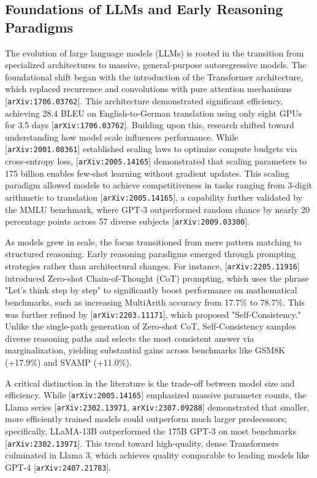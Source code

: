 \documentclass[11pt]{article}
\begin{document}
\subsection{Foundations of LLMs and Early Reasoning Paradigms}

The evolution of large language models (LLMs) is rooted in the transition from specialized architectures to massive, general-purpose autoregressive models. The foundational shift began with the introduction of the Transformer architecture, which replaced recurrence and convolutions with pure attention mechanisms [\texttt{arXiv:1706.03762}]. This architecture demonstrated significant efficiency, achieving 28.4 BLEU on English-to-German translation using only eight GPUs for 3.5 days [\texttt{arXiv:1706.03762}]. Building upon this, research shifted toward understanding how model scale influences performance. While [\texttt{arXiv:2001.08361}] established scaling laws to optimize compute budgets via cross-entropy loss, [\texttt{arXiv:2005.14165}] demonstrated that scaling parameters to 175 billion enables few-shot learning without gradient updates. This scaling paradigm allowed models to achieve competitiveness in tasks ranging from 3-digit arithmetic to translation [\texttt{arXiv:2005.14165}], a capability further validated by the MMLU benchmark, where GPT-3 outperformed random chance by nearly 20 percentage points across 57 diverse subjects [\texttt{arXiv:2009.03300}].

As models grew in scale, the focus transitioned from mere pattern matching to structured reasoning. Early reasoning paradigms emerged through prompting strategies rather than architectural changes. For instance, [\texttt{arXiv:2205.11916}] introduced Zero-shot Chain-of-Thought (CoT) prompting, which uses the phrase "Let's think step by step" to significantly boost performance on mathematical benchmarks, such as increasing MultiArith accuracy from 17.7\% to 78.7\%. This was further refined by [\texttt{arXiv:2203.11171}], which proposed "Self-Consistency." Unlike the single-path generation of Zero-shot CoT, Self-Consistency samples diverse reasoning paths and selects the most consistent answer via marginalization, yielding substantial gains across benchmarks like GSM8K (+17.9\%) and SVAMP (+11.0\%).

A critical distinction in the literature is the trade-off between model size and efficiency. While [\texttt{arXiv:2005.14165}] emphasized massive parameter counts, the Llama series [\texttt{arXiv:2302.13971}, \texttt{arXiv:2307.09288}] demonstrated that smaller, more efficiently trained models could outperform much larger predecessors; specifically, LLaMA-13B outperformed the 175B GPT-3 on most benchmarks [\texttt{arXiv:2302.13971}]. This trend toward high-quality, dense Transformers culminated in Llama 3, which achieves quality comparable to leading models like GPT-4 [\texttt{arXiv:2407.21783}].
\end{document}
